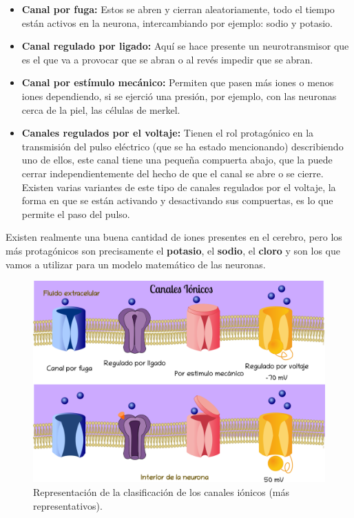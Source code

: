 \begin{itemize}
\item \textbf{Canal por fuga:} Estos se abren y cierran aleatoriamente, todo el tiempo están activos en la neurona, intercambiando por ejemplo: sodio y potasio.
\item \textbf{Canal regulado por ligado:} Aquí se hace presente un neurotransmisor que es el que va a provocar que se abran o al revés impedir que se abran.
\item  \textbf{Canal por estímulo mecánico:} Permiten que pasen más iones o menos iones dependiendo, si se ejerció una presión, por ejemplo, con las neuronas cerca
de la piel, las células de merkel.
\item \textbf{Canales regulados por el voltaje:} Tienen el rol protagónico en la transmisión del pulso eléctrico (que se ha estado mencionando) describiendo uno de ellos, este canal tiene una pequeña compuerta abajo, que la puede cerrar independientemente del hecho de que el canal se abre o se cierre. Existen varias variantes de este tipo de canales regulados por el voltaje, la forma en que se están activando y desactivando sus compuertas, es lo que permite el paso del pulso.
\end{itemize}


Existen realmente una buena cantidad de iones presentes en el cerebro, pero los más protagónicos son precisamente el \textbf{potasio}, el \textbf{sodio}, el \textbf{cloro} y son los que vamos a utilizar para un modelo matemático de las neuronas. 


\begin{figure}[h]
 \centering
 \includegraphics[scale=0.28]{../Figuras/canalesIonicos.png}
 \caption{Representación de la clasificación de los canales iónicos (más representativos).}
 \label{fig:MembranaP}
\end{figure}




